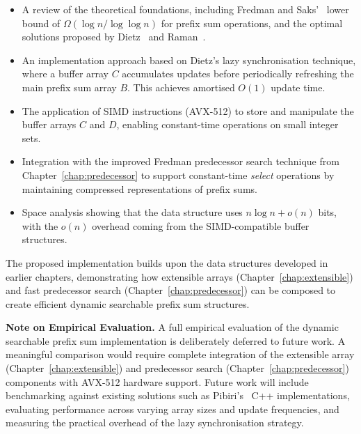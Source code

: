 \begin{itemize}
    \item A review of the theoretical foundations, including Fredman and Saks'~\cite{FREDMAN1993424} lower bound of $\Omega(\log n / \log \log n)$ for prefix sum operations, and the optimal solutions proposed by Dietz~\cite{Dietz_1989} and Raman~\cite{Raman_2001}.

    \item An implementation approach based on Dietz's lazy synchronisation technique, where a buffer array $C$ accumulates updates before periodically refreshing the main prefix sum array $B$. This achieves amortised $O(1)$ update time.

    \item The application of SIMD instructions (AVX-512) to store and manipulate the buffer arrays $C$ and $D$, enabling constant-time operations on small integer sets.

    \item Integration with the improved Fredman predecessor search technique from Chapter~\ref{chap:predecessor} to support constant-time \textit{select} operations by maintaining compressed representations of prefix sums.

    \item Space analysis showing that the data structure uses $n \log n + o(n)$ bits, with the $o(n)$ overhead coming from the SIMD-compatible buffer structures.
\end{itemize}

The proposed implementation builds upon the data structures developed in earlier chapters, demonstrating how extensible arrays (Chapter~\ref{chap:extensible}) and fast predecessor search (Chapter~\ref{chap:predecessor}) can be composed to create efficient dynamic searchable prefix sum structures.

\textbf{Note on Empirical Evaluation.} A full empirical evaluation of the dynamic searchable prefix sum implementation is deliberately deferred to future work. A meaningful comparison would require complete integration of the extensible array (Chapter~\ref{chap:extensible}) and predecessor search (Chapter~\ref{chap:predecessor}) components with AVX-512 hardware support. Future work will include benchmarking against existing solutions such as Pibiri's~\cite{Pibiri_2020} C++ implementations, evaluating performance across varying array sizes and update frequencies, and measuring the practical overhead of the lazy synchronisation strategy.
